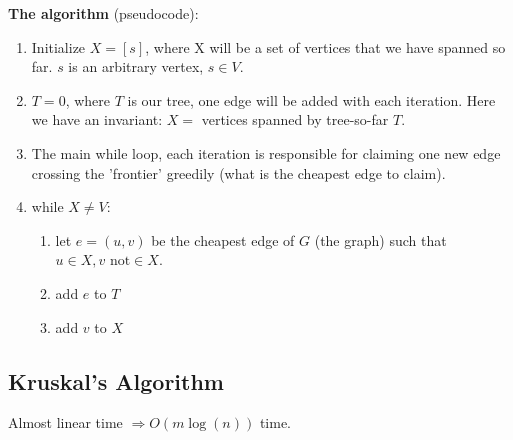 \documentclass{article}
\begin{document}
\textbf{The algorithm} (pseudocode):
\
\begin{enumerate}
  \item Initialize $X = [s]$, where X will be a set of vertices that we have spanned so far. $s$ is an arbitrary vertex, $s \in V$.
  \item $T = 0$, where $T$ is our tree, one edge will be added with each iteration.  Here we have an invariant: $X =$ vertices spanned by tree-so-far $T$. 
  \item The main while loop, each iteration is responsible for claiming one new edge crossing the 'frontier' greedily (what is the cheapest edge to claim).
  \item while $X \neq V:$
    \
    \begin{enumerate}
      \item let $e = (u,v)$ be the cheapest edge of $G$ (the graph) such that $u \in X, v \text{ not} \in X$.
      \item add $e$ to $T$
      \item add $v$ to $X$
    \end{enumerate}
\end{enumerate}

\subsection{Kruskal's Algorithm}
Almost linear time $\Rightarrow O(m\log(n))$ time.
\end{document}
